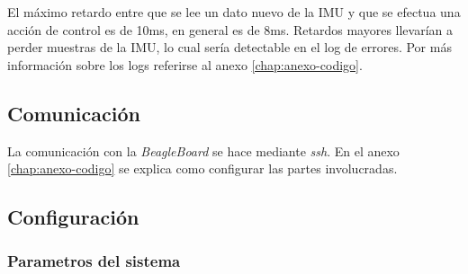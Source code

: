 \documentclass[main]{subfiles}
\begin{document}
El m\'aximo retardo entre que se lee un dato nuevo de la IMU y que se efectua una acci\'on de control es de 10ms, en general es de 8ms. Retardos mayores llevar\'ian a perder muestras de la IMU, lo cual ser\'ia detectable en el log de errores. Por m\'as informaci\'on sobre los logs referirse al anexo \ref{chap:anexo-codigo}.

\subsection{Comunicaci\'on}
\label{sec:software-comm}

La comunicaci\'on con la \textit{BeagleBoard} se hace mediante \textit{ssh}. En el anexo \ref{chap:anexo-codigo} se explica como configurar las partes involucradas.

\subsection{Configuraci\'on}
\label{sec:software-config}

\subsubsection{Parametros del sistema}
\label{sec:software:param-del-sistema}
\end{document}
